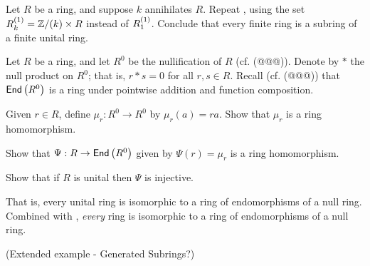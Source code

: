 \begin{exercise}
Let \(R\) be a ring, and suppose \(k\) annihilates \(R\).
Repeat , using the set \(\ADJUNIT[k]{R} = \ZZ/(k) \times R\) instead of \(\ADJUNIT{R}\).
Conclude that every finite ring is a subring of a finite unital ring.
\end{exercise}

\begin{exercise}
Let \(R\) be a ring, and let \(R^0\) be the nullification of \(R\) (cf. (@@@)).
Denote by \(\ast\) the null product on \(R^0\); that is, \(r \ast s = 0\) for all \(r,s \in R\).
Recall (cf. (@@@)) that \(\END{R^0}\) is a ring under pointwise addition and function composition.
\begin{proplist}
\item Given \(r \in R\), define \(\mu_r : R^0 \rightarrow R^0\) by \(\mu_r(a) = ra\).
Show that \(\mu_r\) is a ring homomorphism.
\item Show that \(\Psi : R \rightarrow \END{R^0}\) given by \(\Psi(r) = \mu_r\) is a ring homomorphism.
\item Show that if \(R\) is unital then \(\Psi\) is injective.
\end{proplist}
That is, every unital ring is isomorphic to a ring of endomorphisms of a null ring.
Combined with , \emph{every} ring is isomorphic to a ring of endomorphisms of a null ring.
\end{exercise}

(Extended example - Generated Subrings?)
